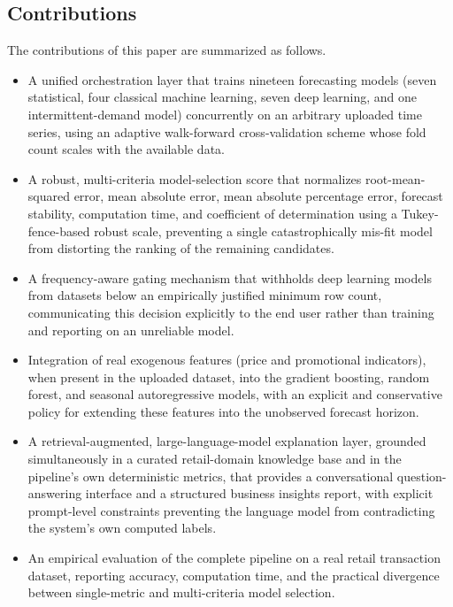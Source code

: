 \subsection{Contributions}
The contributions of this paper are summarized as follows.
\begin{itemize}
    \item A unified orchestration layer that trains nineteen forecasting models (seven statistical, four classical machine learning, seven deep learning, and one intermittent-demand model) concurrently on an arbitrary uploaded time series, using an adaptive walk-forward cross-validation scheme whose fold count scales with the available data.
    \item A robust, multi-criteria model-selection score that normalizes root-mean-squared error, mean absolute error, mean absolute percentage error, forecast stability, computation time, and coefficient of determination using a Tukey-fence-based robust scale, preventing a single catastrophically mis-fit model from distorting the ranking of the remaining candidates.
    \item A frequency-aware gating mechanism that withholds deep learning models from datasets below an empirically justified minimum row count, communicating this decision explicitly to the end user rather than training and reporting on an unreliable model.
    \item Integration of real exogenous features (price and promotional indicators), when present in the uploaded dataset, into the gradient boosting, random forest, and seasonal autoregressive models, with an explicit and conservative policy for extending these features into the unobserved forecast horizon.
    \item A retrieval-augmented, large-language-model explanation layer, grounded simultaneously in a curated retail-domain knowledge base and in the pipeline's own deterministic metrics, that provides a conversational question-answering interface and a structured business insights report, with explicit prompt-level constraints preventing the language model from contradicting the system's own computed labels.
    \item An empirical evaluation of the complete pipeline on a real retail transaction dataset, reporting accuracy, computation time, and the practical divergence between single-metric and multi-criteria model selection.
\end{itemize}

